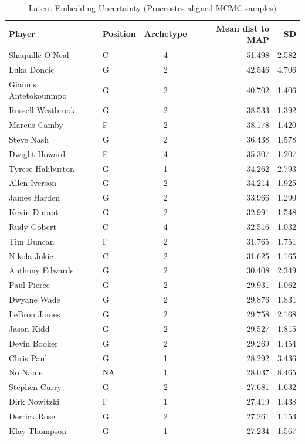 \begin{table}[t]
\caption*{
{\fontsize{20}{25}\selectfont  Latent Embedding Uncertainty (Procrustes-aligned MCMC samples)\fontsize{12}{15}\selectfont }
} 
\fontsize{12.0pt}{14.0pt}\selectfont
\begin{tabular*}{\linewidth}{@{\extracolsep{\fill}}llcrr}
\toprule
Player & Position & Archetype & Mean dist to MAP & SD \\ 
\midrule\addlinespace[2.5pt]
Shaquille O'Neal & C & 4 & 51.498 & 2.582 \\ 
Luka Doncic & G & 2 & 42.546 & 4.706 \\ 
Giannis Antetokounmpo & G & 2 & 40.702 & 1.406 \\ 
Russell Westbrook & G & 2 & 38.533 & 1.392 \\ 
Marcus Camby & F & 2 & 38.178 & 1.420 \\ 
Steve Nash & G & 2 & 36.438 & 1.578 \\ 
Dwight Howard & F & 4 & 35.307 & 1.207 \\ 
Tyrese Haliburton & G & 1 & 34.262 & 2.793 \\ 
Allen Iverson & G & 2 & 34.214 & 1.925 \\ 
James Harden & G & 2 & 33.966 & 1.290 \\ 
Kevin Durant & G & 2 & 32.991 & 1.548 \\ 
Rudy Gobert & C & 4 & 32.516 & 1.032 \\ 
Tim Duncan & F & 2 & 31.765 & 1.751 \\ 
Nikola Jokic & C & 2 & 31.625 & 1.165 \\ 
Anthony Edwards & G & 2 & 30.408 & 2.349 \\ 
Paul Pierce & G & 2 & 29.931 & 1.062 \\ 
Dwyane Wade & G & 2 & 29.876 & 1.831 \\ 
LeBron James & G & 2 & 29.758 & 2.168 \\ 
Jason Kidd & G & 2 & 29.527 & 1.815 \\ 
Devin Booker & G & 2 & 29.269 & 1.454 \\ 
Chris Paul & G & 1 & 28.292 & 3.436 \\ 
No Name & NA & 1 & 28.037 & 8.465 \\ 
Stephen Curry & G & 2 & 27.681 & 1.632 \\ 
Dirk Nowitzki & F & 1 & 27.419 & 1.438 \\ 
Derrick Rose & G & 2 & 27.261 & 1.153 \\ 
Klay Thompson & G & 1 & 27.234 & 1.567 \\ 

\end{tabular*}
\end{table}
